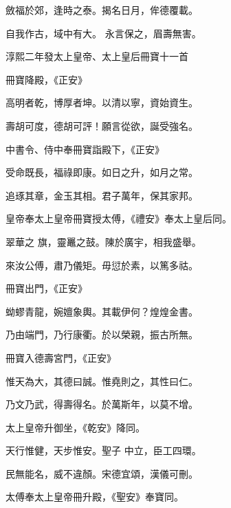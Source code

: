 \begin{pinyinscope}
 斂福於郊，逢時之泰。揭名日月，侔德覆載。



 自我作古，域中有大。
 永言保之，眉壽無害。



 淳熙二年發太上皇帝、太上皇后冊寶十一首



 冊寶降殿，《正安》



 高明者乾，博厚者坤。以清以寧，資始資生。



 壽胡可度，德胡可評！願言從欲，誕受強名。



 中書令、侍中奉冊寶詣殿下，《正安》



 受命既長，福祿即康。如日之升，如月之常。



 追琢其章，金玉其相。君子萬年，保其家邦。



 皇帝奉太上皇帝冊寶授太傅，《禮安》奉太上皇后同。



 翠華之
 旗，靈鼉之鼓。陳於廣宇，相我盛舉。



 來汝公傅，肅乃儀矩。毋愆於素，以篤多祜。



 冊寶出門，《正安》



 蚴蟉青龍，婉嬗象輿。其載伊何？煌煌金書。



 乃由端門，乃行康衢。於以榮親，振古所無。



 冊寶入德壽宮門，《正安》



 惟天為大，其德曰誠。惟堯則之，其性曰仁。



 乃文乃武，得壽得名。於萬斯年，以莫不增。



 太上皇帝升御坐，《乾安》降同。



 天行惟健，天步惟安。聖子
 中立，臣工四環。



 民無能名，威不違顏。宋德宜頌，漢儀可刪。



 太傅奉太上皇帝冊升殿，《聖安》奉寶同。




\end{pinyinscope}
